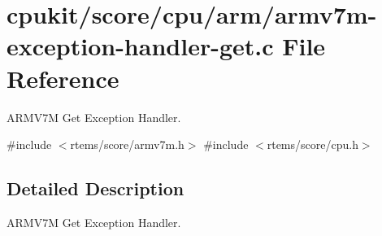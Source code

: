 \hypertarget{armv7m-exception-handler-get_8c}{}\section{cpukit/score/cpu/arm/armv7m-\/exception-\/handler-\/get.c File Reference}
\label{armv7m-exception-handler-get_8c}


A\+R\+M\+V7M Get Exception Handler.  


{\ttfamily \#include $<$rtems/score/armv7m.\+h$>$}\newline
{\ttfamily \#include $<$rtems/score/cpu.\+h$>$}\newline


\subsection{Detailed Description}
A\+R\+M\+V7M Get Exception Handler. 

